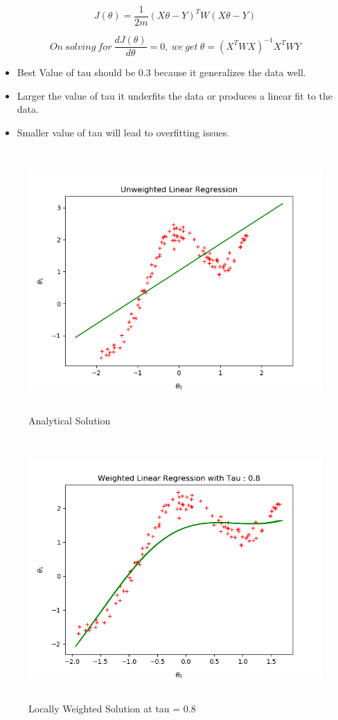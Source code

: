 \documentclass[10pt]{article}
\begin{document}
\[J(\theta) = \frac{1}{2m} (X\theta - Y)^TW(X\theta -Y)\]

\[On \ solving \ for \ \frac{dJ{(\theta)}}{d\theta} = 0, \ we \ get \ \theta = (X^TWX)^{-1}X^TWY\]

\begin{itemize}
 \item Best Value of tau should be 0.3 because it generalizes the data well.
 \item Larger the value of tau it underfits the data or produces a linear fit to the data.
 \item Smaller value of tau will lead to overfitting issues.
\end{itemize}

\begin{figure}[H]
	\includegraphics[width = 15cm,height = 10cm]{Q2_a}
	\caption{Analytical Solution}
\end{figure}

\begin{figure}[H]
	\includegraphics[width = 15cm,height = 10cm]{Q2_b08}
	\caption{Locally Weighted Solution at tau = 0.8}
\end{figure}
\end{document}

